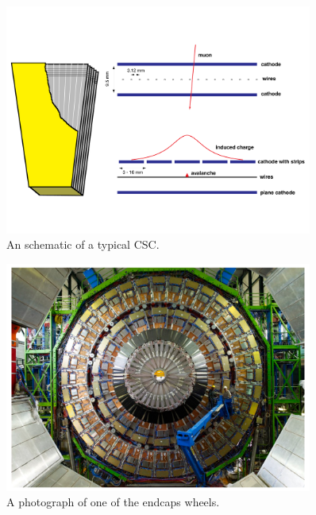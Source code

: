 \begin{figure}
 \centering
\includegraphics[width=0.9\textwidth]{CMS_DetectorFigures/CSC.pdf}
\caption{An schematic of a typical CSC.\label{fig:CSC}}
\end{figure}
\begin{figure}
 \centering
\includegraphics[width=0.9\textwidth]{CMS_DetectorFigures/MuonSystemEndcap.pdf}
\caption{A photograph of one of the endcaps wheels.\label{fig:MuonEndcap}}
\end{figure}
